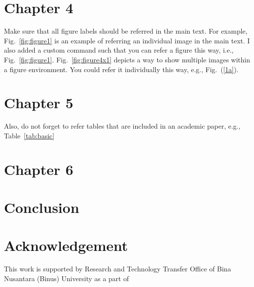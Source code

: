 \documentclass[conference, a4paper]{IEEEtran}
\newcommand\figref{Fig.~\ref}
\begin{document}
\section{Chapter 4}
\label{sec:figures}

Make sure that all figure labels should be referred in the main text.
For example, Fig.~\ref{fig:figure1} is an example of referring an individual image in the main text.
I also added a custom command such that you can refer a figure this way, i.e., \figref{fig:figure1}.
Fig.~\ref{fig:figure4x1} depicts a way to show multiple images within a figure environment.
You could refer it individually this way, e.g., Fig.~(\ref{1a}).






\section{Chapter 5}
\label{sec:tables}

Also, do not forget to refer tables that are included in an academic paper, e.g., Table~\ref{tab:basic}




\section{Chapter 6}
\label{sec:eq}




\section{Conclusion}
\label{sec:conclusion}

\lipsum[3]



\section*{Acknowledgement}
This work is supported by Research and Technology Transfer Office of Bina Nusantara (Binus) University as a part of



\end{document}
